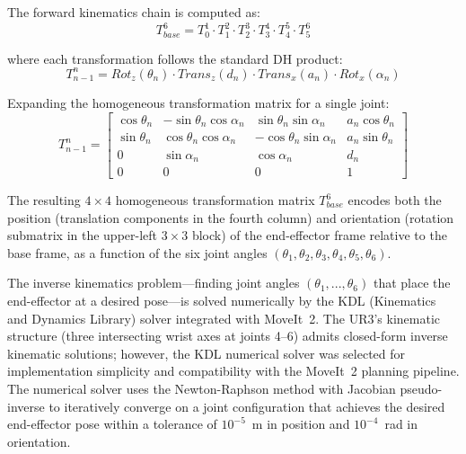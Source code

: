 \documentclass[12pt,a4paper,oneside]{report}
\begin{document}
The forward kinematics chain is computed as:
\begin{equation}
T^6_{base} = T^1_0 \cdot T^2_1 \cdot T^3_2 \cdot T^4_3 \cdot T^5_4 \cdot T^6_5
\label{eq:fk_chain}
\end{equation}

where each transformation follows the standard DH product:
\begin{equation}
T^n_{n-1} = Rot_z(\theta_n) \cdot Trans_z(d_n) \cdot Trans_x(a_n) \cdot Rot_x(\alpha_n)
\label{eq:dh_transform}
\end{equation}

Expanding the homogeneous transformation matrix for a single joint:
\begin{equation}
T^n_{n-1} = \begin{bmatrix}
\cos\theta_n & -\sin\theta_n\cos\alpha_n & \sin\theta_n\sin\alpha_n & a_n\cos\theta_n \\
\sin\theta_n & \cos\theta_n\cos\alpha_n & -\cos\theta_n\sin\alpha_n & a_n\sin\theta_n \\
0 & \sin\alpha_n & \cos\alpha_n & d_n \\
0 & 0 & 0 & 1
\end{bmatrix}
\end{equation}

The resulting $4 \times 4$ homogeneous transformation matrix $T^6_{base}$ encodes both the position (translation components in the fourth column) and orientation (rotation submatrix in the upper-left $3 \times 3$ block) of the end-effector frame relative to the base frame, as a function of the six joint angles $(\theta_1, \theta_2, \theta_3, \theta_4, \theta_5, \theta_6)$.

The inverse kinematics problem---finding joint angles $(\theta_1, ..., \theta_6)$ that place the end-effector at a desired pose---is solved numerically by the KDL (Kinematics and Dynamics Library) solver integrated with MoveIt~2. The UR3's kinematic structure (three intersecting wrist axes at joints 4--6) admits closed-form inverse kinematic solutions; however, the KDL numerical solver was selected for implementation simplicity and compatibility with the MoveIt~2 planning pipeline. The numerical solver uses the Newton-Raphson method with Jacobian pseudo-inverse to iteratively converge on a joint configuration that achieves the desired end-effector pose within a tolerance of $10^{-5}$~m in position and $10^{-4}$~rad in orientation.
\end{document}
